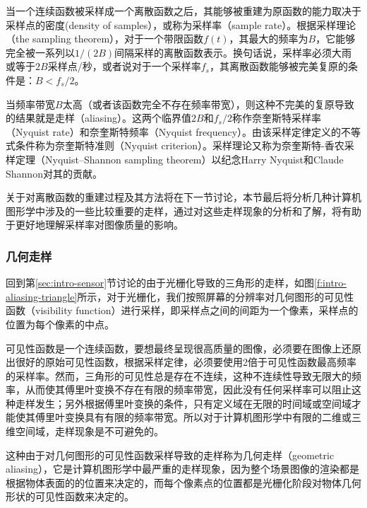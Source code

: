 当一个连续函数被采样成一个离散函数之后，其能够被重建为原函数的能力取决于采样点的密度(density of samples），或称为采样率（sample rate）。根据采样理论（the sampling theorem），对于一个带限函数$f(t)$，其最大的频率为$B$，它能够完全被一系列以$1/(2B)$间隔采样的离散函数表示。换句话说，采样率必须大雨或等于$2B$采样点/秒，或者说对于一个采样率$f_s$，其离散函数能够被完美复原的条件是：$B<f_s/2$。

当频率带宽$B$太高（或者该函数完全不存在频率带宽），则这种不完美的复原导致的结果就是走样（aliasing）。这两个临界值$2B$和$f_s/2$称作奈奎斯特采样率（Nyquist rate）和奈奎斯特频率（Nyquist frequency）。由该采样定律定义的不等式条件称为奈奎斯特准则（Nyquist criterion）。采样理论又称为奈奎斯特-香农采样定理（Nyquist–Shannon sampling theorem）以纪念Harry Nyquist和Claude Shannon对其的贡献。 

关于对离散函数的重建过程及其方法将在下一节讨论，本节最后将分析几种计算机图形学中涉及的一些比较重要的走样，通过对这些走样现象的分析和了解，将有助于更好地理解采样率对图像质量的影响。




\subsubsection{几何走样}
回到第\ref{sec:intro-sensor}节讨论的由于光栅化导致的三角形的走样，如图\ref{f:intro-aliasing-triangle}所示，对于光栅化，我们按照屏幕的分辨率对几何图形的可见性函数（visibility function）进行采样，即采样点之间的间距为一个像素，采样点的位置为每个像素的中点。

可见性函数是一个连续函数，要想最终呈现很高质量的图像，必须要在图像上还原出很好的原始可见性函数，根据采样定律，必须要使用2倍于可见性函数最高频率的采样率。然而，三角形的可见性总是存在不连续，这种不连续性导致无限大的频率，从而使其傅里叶变换不存在有限的频率带宽，因此没有任何采样率可以阻止这种走样发生；另外根据傅里叶变换的条件，只有定义域在无限的时间域或空间域才能使其傅里叶变换具有有限的频率带宽。所以对于计算机图形学中有限的二维或三维空间域，走样现象是不可避免的。

这种由于对几何图形的可见性函数采样导致的走样称为几何走样（geometric aliasing），它是计算机图形学中最严重的走样现象，因为整个场景图像的渲染都是根据物体表面的的位置来决定的，而每个像素点的位置都是光栅化阶段对物体几何形状的可见性函数来决定的。

